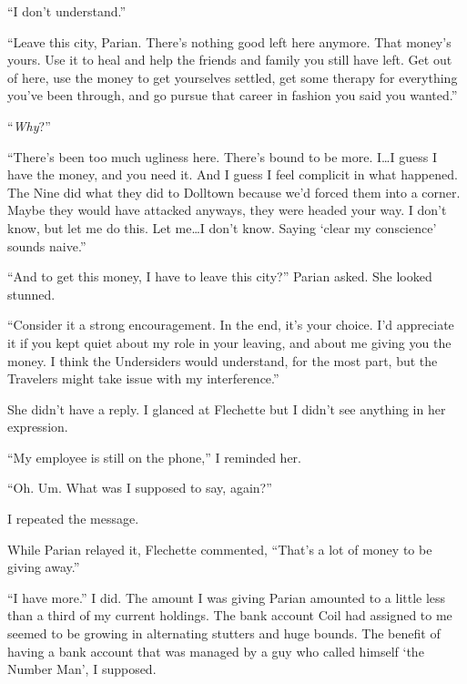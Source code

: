 ``I don't understand.''



``Leave this city, Parian.  There's nothing good left here anymore.  That money's yours.  Use it to heal and help the friends and family you still have left.  Get out of here, use the money to get yourselves settled, get some therapy for everything you've been through, and go pursue that career in fashion you said you wanted.''



``\emph{Why}?''



``There's been too much ugliness here.  There's bound to be more.  I\ldots I guess I have the money, and you need it.  And I guess I feel complicit in what happened.  The Nine did what they did to Dolltown because we'd forced them into a corner.  Maybe they would have attacked anyways, they were headed your way.  I don't know, but let me do this.  Let me\ldots I don't know.  Saying `clear my conscience' sounds naive.''



``And to get this money, I have to leave this city?'' Parian asked.  She looked stunned.



``Consider it a strong encouragement.  In the end, it's your choice.  I'd appreciate it if you kept quiet about my role in your leaving, and about me giving you the money.  I think the Undersiders would understand, for the most part, but the Travelers might take issue with my interference.''



She didn't have a reply.  I glanced at Flechette but I didn't see anything in her expression.



``My employee is still on the phone,'' I reminded her.



``Oh.  Um.  What was I supposed to say, again?''



I repeated the message.



While Parian relayed it, Flechette commented, ``That's a lot of money to be giving away.''



``I have more.''  I did.  The amount I was giving Parian amounted to a little less than a third of my current holdings.  The bank account Coil had assigned to me seemed to be growing in alternating stutters and huge bounds.  The benefit of having a bank account that was managed by a guy who called himself `the Number Man', I supposed.



